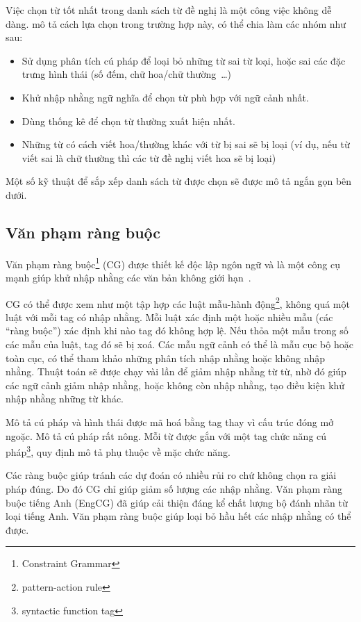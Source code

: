 \documentclass[a4paper,oneside,14pt]{extbook} %
\begin{document}
Việc chọn từ tốt nhất trong danh sách từ đề nghị là một công việc không dễ
dàng. \cite{Agirre} mô tả cách lựa chọn trong trường hợp
này, có thể chia làm các nhóm như sau:

\begin{itemize}
\item Sử dụng phân tích cú pháp để loại bỏ những từ sai từ loại, hoặc
  sai các đặc trưng hình thái (số đếm, chữ hoa/chữ thường~\ldots{})
\item Khử nhập nhằng ngữ nghĩa để chọn từ phù hợp với ngữ cảnh nhất.
\item Dùng thống kê để chọn từ thường xuất hiện nhất.
\item Những từ có cách viết hoa/thường khác với từ bị sai sẽ bị loại
  (ví dụ, nếu từ viết sai là chữ thường thì các từ đề nghị viết hoa sẽ
  bị loại)
\end{itemize}


Một số kỹ thuật để sắp xếp danh sách từ được chọn sẽ được mô tả ngắn
gọn bên dưới.

\subsection{Văn phạm ràng buộc}


Văn phạm ràng buộc\footnote{Constraint Grammar} (CG) được thiết kế
độc lập ngôn ngữ và là một công cụ mạnh giúp khử nhập nhằng các văn
bản không giới hạn~\cite{cg}. 

CG có thể được xem như một tập hợp các luật mẫu-hành
động\footnote{pattern-action rule}, không quá một luật với mỗi tag có nhập
nhằng. Mỗi luật xác định một hoặc nhiều mẫu (các ``ràng buộc'') xác
định khi nào tag đó không hợp lệ. Nếu thỏa một mẫu trong số các mẫu
của luật, tag đó sẽ bị xoá. Các mẫu ngữ cảnh có thể là mẫu cục bộ hoặc
toàn cục, có thể tham khảo những phân tích nhập nhằng hoặc không nhập
nhằng. Thuật toán sẽ được chạy vài lần để giảm nhập nhằng từ từ, nhờ đó
giúp các ngữ cảnh giảm nhập nhằng, hoặc không còn nhập nhằng, tạo điều
kiện khử nhập nhằng những từ khác.

Mô tả cú pháp và hình thái được mã hoá bằng tag thay vì cấu trúc đóng
mở ngoặc. Mô tả cú pháp rất nông. Mỗi từ được gắn với một tag chức
năng cú pháp\footnote{syntactic function tag}, quy định mô tả phụ
thuộc về mặc chức năng.

Các ràng buộc giúp tránh các dự đoán có nhiều rủi ro chứ không chọn ra
giải pháp đúng. Do đó CG chỉ giúp giảm số lượng các nhập nhằng. Văn
phạm ràng buộc tiếng Anh (EngCG) đã giúp cải thiện đáng kể chất 
lượng bộ đánh nhãn từ loại tiếng Anh. Văn phạm ràng buộc giúp loại bỏ
hầu hết các nhập nhằng có thể được.
\end{document}

